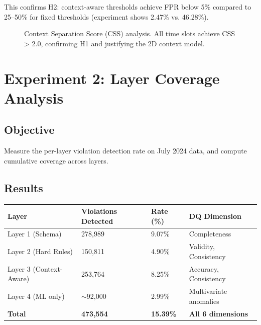 This confirms H2: context-aware thresholds achieve FPR below 5\% compared to 25--50\% for fixed thresholds (experiment shows 2.47\% vs. 46.28\%).

\begin{figure}[H]
\centering
{}
\caption{Context Separation Score (CSS) analysis. All time slots achieve CSS > 2.0, confirming H1 and justifying the 2D context model.}
\end{figure}

\section{Experiment 2: Layer Coverage Analysis}

\subsection{Objective}

Measure the per-layer violation detection rate on July 2024 data, and compute cumulative coverage across layers.

\subsection{Results}

\begin{longtable}{|m{3.5cm}|R{3cm}|R{2cm}|m{4cm}|}
\hline
\textbf{Layer} & \textbf{Violations Detected} & \textbf{Rate (\%)} & \textbf{DQ Dimension} \\ \hline
Layer 1 (Schema) & 278,989 & 9.07\% & Completeness \\ \hline
Layer 2 (Hard Rules) & 150,811 & 4.90\% & Validity, Consistency \\ \hline
Layer 3 (Context-Aware) & 253,764 & 8.25\% & Accuracy, Consistency \\ \hline
Layer 4 (ML only) & $\sim$92,000 & 2.99\% & Multivariate anomalies \\ \hline
\textbf{Total} & \textbf{473,554} & \textbf{15.39\%} & \textbf{All 6 dimensions} \\ \hline
\end{longtable}


